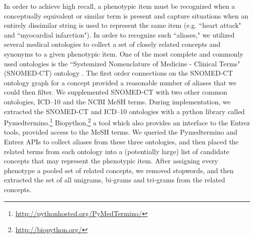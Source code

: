 \documentclass{sig-alternate-05-2015}
\begin{document}

In order to achieve high recall, a phenotypic item must be recognized when a conceptually equivalent or similar term is present and capture situations when an entirely dissimilar string is used to represent the same item  (e.g. ``heart attack" and ``myocardial infarction").
In order to recognize such ``aliases," we utilized several medical ontologies to collect a set of closely related concepts and synonyms to a given phenotypic item.
One of the most complete and commonly used ontologies is the ``Systemized Nomenclature of Medicine - Clinical Terms" (SNOMED-CT) ontology \cite{Wasserman2003}. The first order connections on the SNOMED-CT ontology graph for a concept provided a reasonable number of aliases that we could then filter.
We supplemented SNOMED-CT with two other common ontologies, ICD--10 and the NCBI MeSH terms.
During implementation, we extracted the SNOMED-CT and ICD--10 ontologies with a python library called Pymedtermino.\footnote{\url{http://pythonhosted.org/PyMedTermino/}}
Biopython,\footnote{\url{http://biopython.org/}} a tool which also provides an interface to the Entrez tools, provided access to the MeSH terms.
We queried the Pymedtermino and Entrez APIs to collect aliases from these three ontologies, and then placed the related terms from each ontology into a (potentially large) list of candidate concepts that may represent the phenotypic item.
After assigning every phenotype a pooled set of related concepts, we removed stopwords, and then extracted the set of all unigrams, bi-grams and tri-grams from the related concepts.
\end{document}

